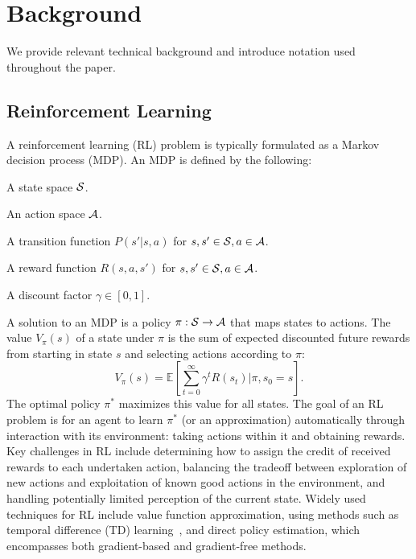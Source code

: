 \section{Background}
We provide relevant technical background and introduce notation
used throughout the paper.

\subsection{Reinforcement Learning}
A reinforcement learning (RL) problem is typically formulated as
a Markov decision process (MDP). An MDP is defined by the following:

\begin{tightlist}
\item A state space $\mathcal{S}$.
\item An action space $\mathcal{A}$.
\item A transition function $P(s' | s, a)$ for $s, s' \in \mathcal{S}, a \in \mathcal{A}$.
\item A reward function $R(s, a, s')$ for $s, s' \in \mathcal{S}, a \in \mathcal{A}$.
\item A discount factor $\gamma \in [0, 1]$.
\end{tightlist}
A solution to an MDP is a policy $\pi: \mathcal{S} \rightarrow \mathcal{A}$ that maps states to
actions. The value $V_{\pi}(s)$ of a state under $\pi$ is the sum of expected
discounted future rewards from starting in state $s$ and selecting actions according
to $\pi$:
$$V_{\pi}(s) = \mathbb{E}[\sum_{t=0}^{\infty}\gamma^{t}R(s_{t}) | \pi, s_{0} = s].$$
The optimal policy $\pi^{*}$ maximizes this value for all states. The goal of an RL
problem is for an agent to learn $\pi^{*}$ (or an approximation) automatically
through interaction with its environment: taking actions within it and obtaining
rewards. Key challenges in RL include determining how to assign
the credit of received rewards to each undertaken action, balancing the tradeoff between
exploration of new actions and exploitation of known good actions in the environment, and handling
potentially limited perception of the current state. Widely used techniques for RL include value
function approximation, using methods such as temporal difference (TD) learning~\cite{suttonbarto},
and direct policy estimation, which encompasses both gradient-based and gradient-free methods.


